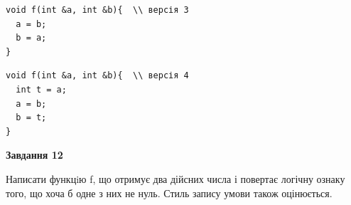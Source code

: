 \documentclass[12pt, ukrainian]{article}
\begin{document}
{\begin {large}
\begin{minipage}[t]{11.0cm}
\vspace{-8mm}\begin{verbatim}
void f(int &a, int &b){  \\ версія 3
  a = b;
  b = a;
}
\end{verbatim}

\vspace{-8mm}\begin{verbatim}
void f(int &a, int &b){  \\ версія 4
  int t = a;
  a = b;
  b = t;
}
\end{verbatim}



\begin{center}
\textbf{Завдання 12}
\end{center}

Написати функцiю f, що отримує два дійсних числа і повертає логічну ознаку того, що хоча б одне з них не нуль. Стиль запису умови також оцінюється.\par

\end{minipage}

\end {large}}
\newpage
\end{document}
